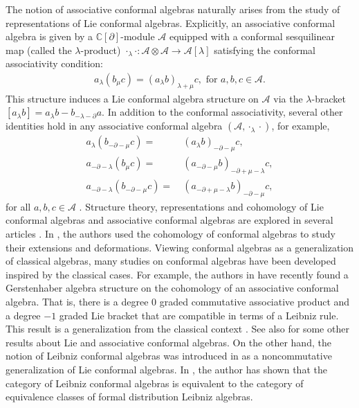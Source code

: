 \documentclass[a4paper,reqno,10pt]{amsart}
\theoremstyle{plain}
\theoremstyle{definition}
\theoremstyle{remark}
\newcommand{\C}{\mathbb{C}}
\newcommand{\p}{\partial}
\newcommand{\la}{\lambda}
\begin{document}
The notion of associative conformal algebras naturally arises from the study of representations of Lie conformal algebras. Explicitly, an associative conformal algebra is given by a $\C[\p]$-module $\mathcal{A}$ equipped with a conformal sesquilinear map (called the $\la$-product) $\cdot_{\la} \cdot: \mathcal{A}\otimes \mathcal{A} \to \mathcal{A}[\la]$ satisfying the conformal associativity condition:
\begin{align*}
 a_{\la}(b_{\mu}c)= (a_{\la}b)_{\la + \mu } c, \text{ for }a, b, c \in \mathcal{A}.
\end{align*}
This structure induces a Lie conformal algebra structure on $\mathcal{A}$ via the  $\la$-bracket $[a_{\la}b] = a_{\la}b - b_{-\la - \p} a$. In addition to the conformal associativity, several other identities hold in any associative conformal algebra $(\mathcal{A}, \cdot_{\la} \cdot)$, for example, 
\begin{align}
    a_{\la}(b_{-\p -\mu}c) =~& (a_{\la}b)_{-\p -\mu}c,\label{equation a}\\
    a_{-\p -\la}(b_{\mu}c) =~& (a_{-\p -\mu}b)_{-\p +\mu -\la }c,\label{equation b}\\
    a_{-\p -\la}(b_{-\p -\mu}c) =~& (a_{-\p +\mu -\la}b)_{-\p -\mu }c \label{equation c},
\end{align} 
for all $a,b,c \in \mathcal{A}$ \cite{andrea-kac}. Structure theory, representations and cohomology of Lie conformal algebras and associative conformal algebras are explored in several articles \cite{andrea-kac, fattori-kac, hong-su,Kolesnikov, roitman-1}. In \cite{bakalov-kac-voronov}, the authors used the cohomology of conformal algebras to study their extensions and deformations. Viewing conformal algebras as a generalization of classical algebras, many studies on conformal algebras have been developed inspired by the classical cases. For example, the authors in \cite{Hou-Shen-Zhao} have recently found a Gerstenhaber algebra structure on the cohomology of an associative conformal algebra. That is, there is a degree $0$ graded commutative associative product and a degree $-1$ graded Lie bracket that are compatible in terms of a Leibniz rule. This result is a generalization from the classical context \cite{gers-ring,gers-voro}. See also \cite{bakalov-kac-voronov, bpz, andrea-kac,fattori-kac,kac-2,hong-su,hong-bai,Kolesnikov,koli-Sart,roitman-1,sole-kac} for some other results about Lie and associative conformal algebras. On the other hand, the notion of Leibniz conformal algebras was introduced in \cite{bakalov-kac-voronov} as a noncommutative generalization of Lie conformal algebras. In \cite{zhang}, the author has shown that the category of Leibniz conformal algebras is equivalent to the category of equivalence classes of formal distribution Leibniz algebras.
\end{document}
